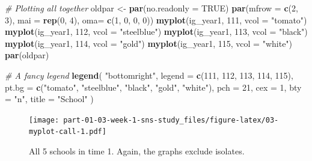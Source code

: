 \documentclass[
]{book}
\newenvironment{Shaded}{\begin{snugshade}}{\end{snugshade}}
\newcommand{\AttributeTok}[1]{\textcolor[rgb]{0.13,0.29,0.53}{#1}}
\newcommand{\CommentTok}[1]{\textcolor[rgb]{0.56,0.35,0.01}{\textit{#1}}}
\newcommand{\ConstantTok}[1]{\textcolor[rgb]{0.56,0.35,0.01}{#1}}
\newcommand{\DecValTok}[1]{\textcolor[rgb]{0.00,0.00,0.81}{#1}}
\newcommand{\FunctionTok}[1]{\textcolor[rgb]{0.13,0.29,0.53}{\textbf{#1}}}
\newcommand{\NormalTok}[1]{#1}
\newcommand{\OtherTok}[1]{\textcolor[rgb]{0.56,0.35,0.01}{#1}}
\newcommand{\StringTok}[1]{\textcolor[rgb]{0.31,0.60,0.02}{#1}}
\begin{document}
\begin{Shaded}
\begin{Highlighting}[]
\CommentTok{\# Plotting all together}
\NormalTok{oldpar }\OtherTok{\textless{}{-}} \FunctionTok{par}\NormalTok{(}\AttributeTok{no.readonly =} \ConstantTok{TRUE}\NormalTok{)}
\FunctionTok{par}\NormalTok{(}\AttributeTok{mfrow =} \FunctionTok{c}\NormalTok{(}\DecValTok{2}\NormalTok{, }\DecValTok{3}\NormalTok{), }\AttributeTok{mai =} \FunctionTok{rep}\NormalTok{(}\DecValTok{0}\NormalTok{, }\DecValTok{4}\NormalTok{), }\AttributeTok{oma=} \FunctionTok{c}\NormalTok{(}\DecValTok{1}\NormalTok{, }\DecValTok{0}\NormalTok{, }\DecValTok{0}\NormalTok{, }\DecValTok{0}\NormalTok{))}
\FunctionTok{myplot}\NormalTok{(ig\_year1, }\DecValTok{111}\NormalTok{, }\AttributeTok{vcol =} \StringTok{"tomato"}\NormalTok{)}
\FunctionTok{myplot}\NormalTok{(ig\_year1, }\DecValTok{112}\NormalTok{, }\AttributeTok{vcol =} \StringTok{"steelblue"}\NormalTok{)}
\FunctionTok{myplot}\NormalTok{(ig\_year1, }\DecValTok{113}\NormalTok{, }\AttributeTok{vcol =} \StringTok{"black"}\NormalTok{)}
\FunctionTok{myplot}\NormalTok{(ig\_year1, }\DecValTok{114}\NormalTok{, }\AttributeTok{vcol =} \StringTok{"gold"}\NormalTok{)}
\FunctionTok{myplot}\NormalTok{(ig\_year1, }\DecValTok{115}\NormalTok{, }\AttributeTok{vcol =} \StringTok{"white"}\NormalTok{)}
\FunctionTok{par}\NormalTok{(oldpar)}

\CommentTok{\# A fancy legend}
\FunctionTok{legend}\NormalTok{(}
  \StringTok{"bottomright"}\NormalTok{,}
  \AttributeTok{legend =} \FunctionTok{c}\NormalTok{(}\DecValTok{111}\NormalTok{, }\DecValTok{112}\NormalTok{, }\DecValTok{113}\NormalTok{, }\DecValTok{114}\NormalTok{, }\DecValTok{115}\NormalTok{),}
  \AttributeTok{pt.bg  =} \FunctionTok{c}\NormalTok{(}\StringTok{"tomato"}\NormalTok{, }\StringTok{"steelblue"}\NormalTok{, }\StringTok{"black"}\NormalTok{, }\StringTok{"gold"}\NormalTok{, }\StringTok{"white"}\NormalTok{),}
  \AttributeTok{pch    =} \DecValTok{21}\NormalTok{,}
  \AttributeTok{cex    =} \DecValTok{1}\NormalTok{,}
  \AttributeTok{bty    =} \StringTok{"n"}\NormalTok{,}
  \AttributeTok{title  =} \StringTok{"School"}
\NormalTok{  )}
\end{Highlighting}
\end{Shaded}

\begin{figure}
\centering
\texttt{[image: part-01-03-week-1-sns-study\_files/figure-latex/03-myplot-call-1.pdf]}
\caption{\label{fig:03-myplot-call}All 5 schools in time 1. Again, the graphs exclude isolates.}
\end{figure}
\end{document}
